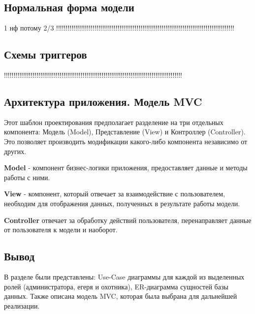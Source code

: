 	\subsection{Нормальная форма модели}
	1 нф потому
	2/3
	!!!!!!!!!!!!!!!!!!!!!!!!!!!!!!!!!!!!!!!!!!!!!!!!!!!!!!!!!!!!!!!!!!!!!!!!!!!!!!!!!!!!!!!!!!!!!
	
	\subsection{Схемы триггеров}
	!!!!!!!!!!!!!!!!!!!!!!!!!!!!!!!!!!!!!!!!!!!!!!!!!!!!!!!!!!!!!!!!!!!!!!!!!!!!!!!!!!!!!!!!!!!!!

	\subsection{Архитектура приложения. Модель MVC}
	Этот шаблон проектирования предполагает разделение на три отдельных компонента: Модель (Model), Представление (View) и Контроллер (Controller). Это позволяет производить модификации какого-либо компонента независимо от других. \cite{mvc} 
	
	\textbf{Model} - компонент бизнес-логики приложения, предоставляет данные и методы работы с ними.
	
	\textbf{View} - компонент, который отвечает за взаимодействие с пользователем, необходим для отображения данных, полученных в результате работы модели.
	
	\textbf{Controller} отвечает за обработку действий пользователя, перенаправляет данные от пользователя к модели и наоборот.\\
	
	\subsection*{Вывод}
	В разделе были представлены: Use-Case диаграммы для каждой из выделенных ролей (администратора, егеря и охотника), ER-диаграмма сущностей базы данных. Также описана модель MVC, которая была выбрана для дальнейшей реализации.




	
	